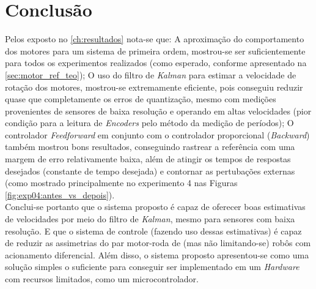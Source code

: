 \chapter[Conclusão]{Conclusão}
\label{ch:conclusao}


Pelos exposto no \autoref{ch:resultados} nota-se que: A aproximação do comportamento dos motores para um sistema de primeira ordem, mostrou-se ser suficientemente para todos os experimentos realizados (como esperado, conforme apresentado na \autoref{sec:motor_ref_teo}); O uso do filtro de \emph{Kalman} para estimar a velocidade de rotação dos motores, mostrou-se extremamente eficiente, pois conseguiu reduzir quase que completamente os erros de quantização, mesmo com medições provenientes de sensores de baixa resolução e operando em altas velocidades (pior condição para a leitura de \emph{Encoders} pelo método da medição de períodos); O controlador \emph{Feedforward} em conjunto com o controlador proporcional (\emph{Backward}) também mostrou bons resultados, conseguindo rastrear a referência com uma margem de erro relativamente baixa, além de atingir os tempos de respostas desejados (constante de tempo desejada) e contornar as pertubações externas (como mostrado principalmente no experimento 4 nas Figuras \ref{fig:exp04:antes_vs_depois}).\\

Conclui-se portanto que o sistema proposto é capaz de oferecer boas estimativas de velocidades por meio do filtro de \emph{Kalman}, mesmo para sensores com baixa resolução. E que o sistema de controle (fazendo uso dessas estimativas) é capaz de reduzir as assimetrias do par motor-roda de (mas não limitando-se) robôs com acionamento diferencial. Além disso, o sistema proposto apresentou-se como uma solução simples o suficiente para conseguir ser implementado em um \emph{Hardware} com recursos limitados, como um  microcontrolador.\\

